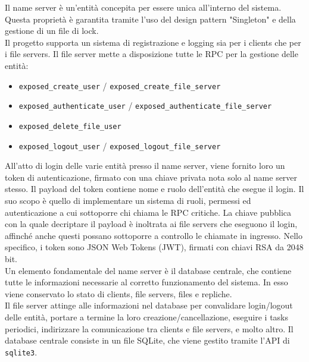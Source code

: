 \documentclass[a4paper, 12pt]{scrreprt}
\begin{document}
            Il name server è un'entità concepita per essere unica all'interno del sistema. Questa proprietà è garantita tramite l'uso del design pattern "Singleton" e della gestione di un file di lock.\\
            Il progetto supporta un sistema di registrazione e logging sia per i clients che per i file servers. Il file server mette a disposizione tutte le RPC per la gestione delle entità:

            \begin{itemize}

                \item \texttt{exposed\_create\_user} / \texttt{exposed\_create\_file\_server}

                \item \texttt{exposed\_authenticate\_user} / \texttt{exposed\_authenticate\_file\_server}

                \item \texttt{exposed\_delete\_file\_user}

                \item \texttt{exposed\_logout\_user} / \texttt{exposed\_logout\_file\_server}

            \end{itemize}

            All'atto di login delle varie entità presso il name server, viene fornito loro un token di autenticazione, firmato con una chiave privata nota solo al name server stesso. Il payload del token contiene nome e ruolo dell'entità che esegue il login. Il suo scopo è quello di implementare un sistema di ruoli, permessi ed autenticazione a cui sottoporre chi chiama le RPC critiche. La chiave pubblica con la quale decriptare il payload è inoltrata ai file servers che eseguono il login, affinché anche questi possano sottoporre a controllo le chiamate in ingresso. Nello specifico, i token sono JSON Web Tokens (JWT), firmati con chiavi RSA da 2048 bit.\\
            Un elemento fondamentale del name server è il database centrale, che contiene tutte le informazioni necessarie al corretto funzionamento del sistema. In esso viene conservato lo stato di clients, file servers, files e repliche.\\
            Il file server attinge alle informazioni nel database per convalidare login/logout delle entità, portare a termine la loro creazione/cancellazione, eseguire i tasks periodici, indirizzare la comunicazione tra clients e file servers, e molto altro. Il database centrale consiste in un file SQLite, che viene gestito tramite l'API di \texttt{sqlite3}.
\end{document}
